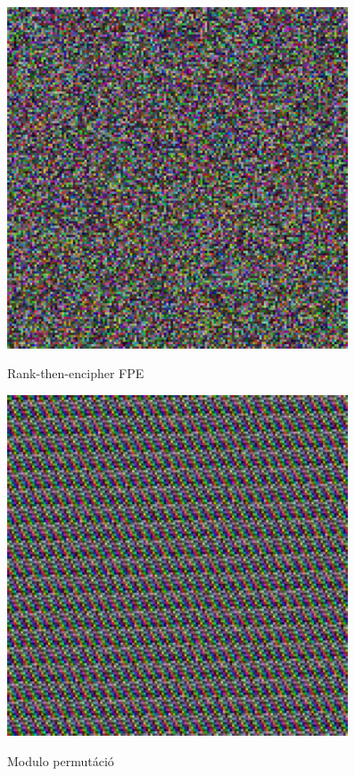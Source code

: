 \documentclass[
    parspace,
    noindent,
    nohyp,
]{elteiktdk}[2023/04/10]
\begin{document}
\begin{figure}[H]
  \centering
  \hspace*{\fill}
  \begin{minipage}[b]{0.45\textwidth}
    \centering
    \includegraphics[width=0.9\textwidth]{image/permutation-fpe1.png}
    \par Rank-then-encipher FPE\protect\cite{Bellare2009FormatPreservingE}
  \end{minipage}
  \hspace*{\fill}
  \begin{minipage}[b]{0.45\textwidth}
    \centering
    \includegraphics[width=0.9\textwidth]{image/permutation-mp1.png}
    \par Modulo permutáció
  \end{minipage}
  \hspace*{\fill}
  

\end{figure}
\end{document}
